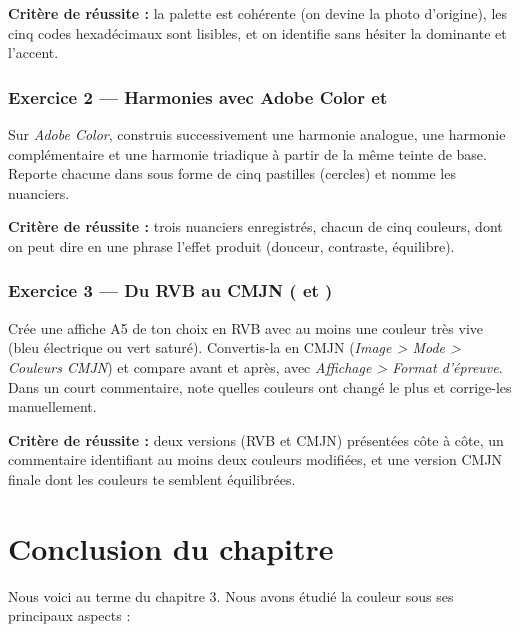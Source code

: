 \noindent\textbf{Critère de réussite :} la palette est cohérente (on devine la photo d'origine), les cinq codes hexadécimaux sont lisibles, et on identifie sans hésiter la dominante et l'accent.

\subsubsection*{Exercice 2 --- Harmonies avec Adobe Color et }

Sur \emph{Adobe Color}, construis successivement une harmonie analogue, une harmonie complémentaire et une harmonie triadique à partir de la même teinte de base. Reporte chacune dans  sous forme de cinq pastilles (cercles) et nomme les nuanciers.

\noindent\textbf{Critère de réussite :} trois nuanciers enregistrés, chacun de cinq couleurs, dont on peut dire en une phrase l'effet produit (douceur, contraste, équilibre).

\subsubsection*{Exercice 3 --- Du RVB au CMJN ( et )}

Crée une affiche A5 de ton choix en RVB avec au moins une couleur très vive (bleu électrique ou vert saturé). Convertis-la en CMJN (\emph{Image > Mode > Couleurs CMJN}) et compare avant et après, avec \emph{Affichage > Format d'épreuve}. Dans un court commentaire, note quelles couleurs ont changé le plus et corrige-les manuellement.

\noindent\textbf{Critère de réussite :} deux versions (RVB et CMJN) présentées côte à côte, un commentaire identifiant au moins deux couleurs modifiées, et une version CMJN finale dont les couleurs te semblent équilibrées.

\section*{Conclusion du chapitre}

Nous voici au terme du chapitre 3. Nous avons étudié la couleur sous ses principaux aspects :

